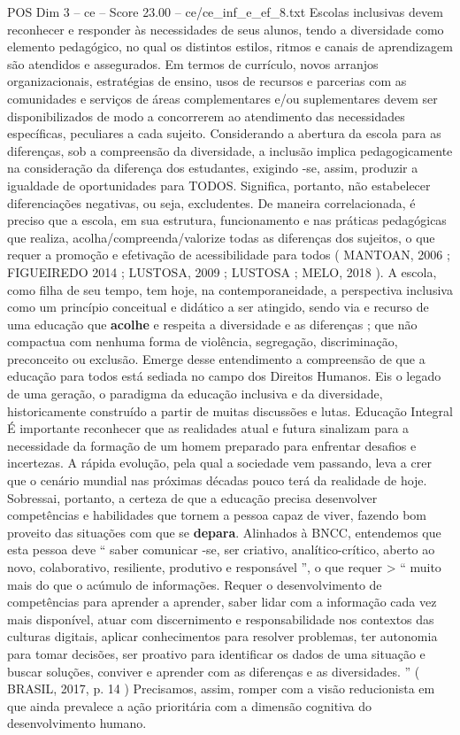 \begin{textsample}{POS Dim 3 – ce – Score 23.00 – ce/ce\_inf\_e\_ef\_8.txt}
Escolas inclusivas devem reconhecer e responder às necessidades de seus alunos, tendo a diversidade como elemento pedagógico, no qual os distintos estilos, ritmos e canais de aprendizagem são atendidos e assegurados.
Em termos de currículo, novos arranjos organizacionais, estratégias de ensino, usos de recursos e parcerias com as comunidades e serviços de áreas complementares e/ou suplementares devem ser disponibilizados de modo a concorrerem ao atendimento das necessidades específicas, peculiares a cada sujeito.
Considerando a abertura da escola para as diferenças, sob a compreensão da diversidade, a inclusão implica pedagogicamente na consideração da diferença dos estudantes, exigindo -se, assim, produzir a igualdade de oportunidades para TODOS.
Significa, portanto, não estabelecer diferenciações negativas, ou seja, excludentes.
De maneira correlacionada, é preciso que a escola, em sua estrutura, funcionamento e nas práticas pedagógicas que realiza, acolha/compreenda/valorize todas as diferenças dos sujeitos, o que requer a promoção e efetivação de acessibilidade para todos ( MANTOAN, 2006 ; FIGUEIREDO 2014 ; LUSTOSA, 2009 ; LUSTOSA ; MELO, 2018 ).
A escola, como filha de seu tempo, tem hoje, na contemporaneidade, a perspectiva inclusiva como um princípio conceitual e didático a ser atingido, sendo via e recurso de uma educação que \textbf{acolhe} e respeita a diversidade e as diferenças ; que não compactua com nenhuma forma de violência, segregação, discriminação, preconceito ou exclusão.
Emerge desse entendimento a compreensão de que a educação para todos está sediada no campo dos Direitos Humanos.
Eis o legado de uma geração, o paradigma da educação inclusiva e da diversidade, historicamente construído a partir de muitas discussões e lutas.
Educação Integral É importante reconhecer que as realidades atual e futura sinalizam para a necessidade da formação de um homem preparado para enfrentar desafios e incertezas.
A rápida evolução, pela qual a sociedade vem passando, leva a crer que o cenário mundial nas próximas décadas pouco terá da realidade de hoje.
Sobressai, portanto, a certeza de que a educação precisa desenvolver competências e habilidades que tornem a pessoa capaz de viver, fazendo bom proveito das situações com que se \textbf{depara}.
Alinhados à BNCC, entendemos que esta pessoa deve “ saber comunicar -se, ser criativo, analítico-crítico, aberto ao novo, colaborativo, resiliente, produtivo e responsável ”, o que requer > “ muito mais do que o acúmulo de informações.
Requer o desenvolvimento de competências para aprender a aprender, saber lidar com a informação cada vez mais disponível, atuar com discernimento e responsabilidade nos contextos das culturas digitais, aplicar conhecimentos para resolver problemas, ter autonomia para tomar decisões, ser proativo para identificar os dados de uma situação e buscar soluções, conviver e aprender com as diferenças e as diversidades. ” ( BRASIL, 2017, p. 14 ) Precisamos, assim, romper com a visão reducionista em que ainda prevalece a ação prioritária com a dimensão cognitiva do desenvolvimento humano.

\end{textsample}
